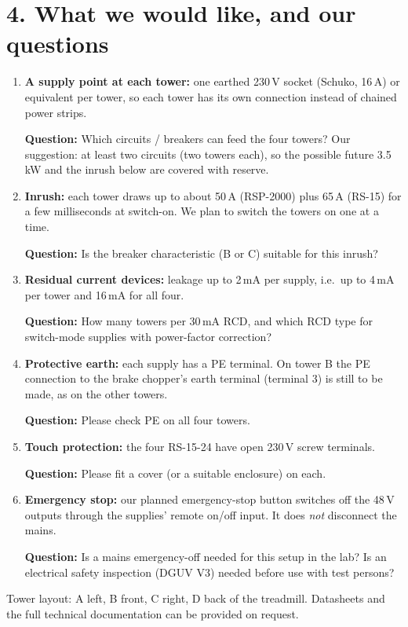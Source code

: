\documentclass[10pt,a4paper]{article}
\newcommand{\q}[1]{\par\smallskip\colorbox{yellow!35}{\parbox{\dimexpr\linewidth-2\fboxsep}{\textbf{Question:} #1}}\par}
\begin{document}
\section*{4. What we would like, and our questions}
\begin{enumerate}
\item \textbf{A supply point at each tower:} one earthed 230\,V socket (Schuko, 16\,A) or equivalent per tower, so each tower
has its own connection instead of chained power strips.
\q{Which circuits / breakers can feed the four towers? Our suggestion: at least two circuits (two towers each), so the possible
future 3.5\,kW and the inrush below are covered with reserve.}
\item \textbf{Inrush:} each tower draws up to about 50\,A (RSP-2000) plus 65\,A (RS-15) for a few milliseconds at switch-on. We
plan to switch the towers on one at a time.
\q{Is the breaker characteristic (B or C) suitable for this inrush?}
\item \textbf{Residual current devices:} leakage up to 2\,mA per supply, i.e.\ up to 4\,mA per tower and 16\,mA for all four.
\q{How many towers per 30\,mA RCD, and which RCD type for switch-mode supplies with power-factor correction?}
\item \textbf{Protective earth:} each supply has a PE terminal. On tower B the PE connection to the brake chopper's earth
terminal (terminal 3) is still to be made, as on the other towers.
\q{Please check PE on all four towers.}
\item \textbf{Touch protection:} the four RS-15-24 have open 230\,V screw terminals.
\q{Please fit a cover (or a suitable enclosure) on each.}
\item \textbf{Emergency stop:} our planned emergency-stop button switches off the 48\,V outputs through the supplies' remote
on/off input. It does \emph{not} disconnect the mains.
\q{Is a mains emergency-off needed for this setup in the lab? Is an electrical safety inspection (DGUV V3) needed before use
with test persons?}
\end{enumerate}

\vfill
\small Tower layout: A left, B front, C right, D back of the treadmill. Datasheets and the full technical documentation can
be provided on request.
\end{document}
